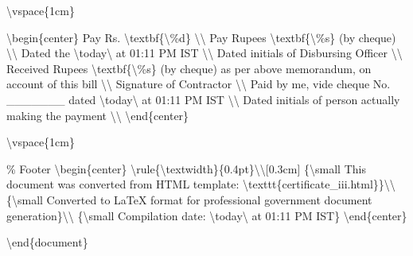 \textbackslash{}vspace\{1cm\}

\textbackslash{}begin\{center\}
Pay Rs. \textbackslash{}textbf\{\textbackslash{}\%d\} \textbackslash{}\textbackslash{}
Pay Rupees \textbackslash{}textbf\{\textbackslash{}\%s\} (by cheque) \textbackslash{}\textbackslash{}
Dated the \textbackslash{}today\textbackslash{} at 01:11 PM IST \textbackslash{}\textbackslash{}
Dated initials of Disbursing Officer \textbackslash{}\textbackslash{}
Received Rupees \textbackslash{}textbf\{\textbackslash{}\%s\} (by cheque) as per above memorandum, on account of this bill \textbackslash{}\textbackslash{}
Signature of Contractor \textbackslash{}\textbackslash{}
Paid by me, vide cheque No. \_\_\_\_\_\_\_ dated \textbackslash{}today\textbackslash{} at 01:11 PM IST \textbackslash{}\textbackslash{}
Dated initials of person actually making the payment \textbackslash{}\textbackslash{}
\textbackslash{}end\{center\}

\textbackslash{}vspace\{1cm\}

\% Footer
\textbackslash{}begin\{center\}
\textbackslash{}rule\{\textbackslash{}textwidth\}\{0.4pt\}\textbackslash{}\textbackslash{}[0.3cm]
\{\textbackslash{}small This document was converted from HTML template: \textbackslash{}texttt\{certificate\_iii.html\}\}\textbackslash{}\textbackslash{}
\{\textbackslash{}small Converted to LaTeX format for professional government document generation\}\textbackslash{}\textbackslash{}
\{\textbackslash{}small Compilation date: \textbackslash{}today\textbackslash{} at 01:11 PM IST\}
\textbackslash{}end\{center\}

\textbackslash{}end\{document\}
